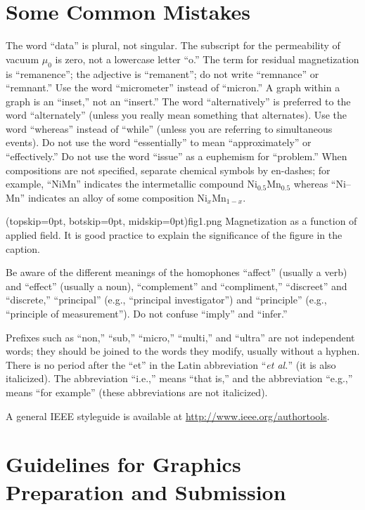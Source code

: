 \documentclass{ieeeaccess}
\begin{document}
\section{Some Common Mistakes}
The word ``data'' is plural, not singular. The subscript for the 
permeability of vacuum $\mu _{0}$ is zero, not a lowercase letter 
``o.'' The term for residual magnetization is ``remanence''; the adjective 
is ``remanent''; do not write ``remnance'' or ``remnant.'' Use the word 
``micrometer'' instead of ``micron.'' A graph within a graph is an 
``inset,'' not an ``insert.'' The word ``alternatively'' is preferred to the 
word ``alternately'' (unless you really mean something that alternates). Use 
the word ``whereas'' instead of ``while'' (unless you are referring to 
simultaneous events). Do not use the word ``essentially'' to mean 
``approximately'' or ``effectively.'' Do not use the word ``issue'' as a 
euphemism for ``problem.'' When compositions are not specified, separate 
chemical symbols by en-dashes; for example, ``NiMn'' indicates the 
intermetallic compound Ni$_{0.5}$Mn$_{0.5}$ whereas 
``Ni--Mn'' indicates an alloy of some composition 
Ni$_{x}$Mn$_{1-x}$.

\Figure[t!](topskip=0pt, botskip=0pt, midskip=0pt){fig1.png}
{Magnetization as a function of applied field.
It is good practice to explain the significance of the figure in the caption.\label{fig1}}

Be aware of the different meanings of the homophones ``affect'' (usually a 
verb) and ``effect'' (usually a noun), ``complement'' and ``compliment,'' 
``discreet'' and ``discrete,'' ``principal'' (e.g., ``principal 
investigator'') and ``principle'' (e.g., ``principle of measurement''). Do 
not confuse ``imply'' and ``infer.'' 

Prefixes such as ``non,'' ``sub,'' ``micro,'' ``multi,'' and ``ultra'' are 
not independent words; they should be joined to the words they modify, 
usually without a hyphen. There is no period after the ``et'' in the Latin 
abbreviation ``\emph{et al.}'' (it is also italicized). The abbreviation ``i.e.,'' means 
``that is,'' and the abbreviation ``e.g.,'' means ``for example'' (these 
abbreviations are not italicized).

A general IEEE styleguide is available at \underline{http://www.ieee.org/}\break\underline{authortools}.

\section{Guidelines for Graphics Preparation and Submission}
\label{sec:guidelines}
\end{document}

